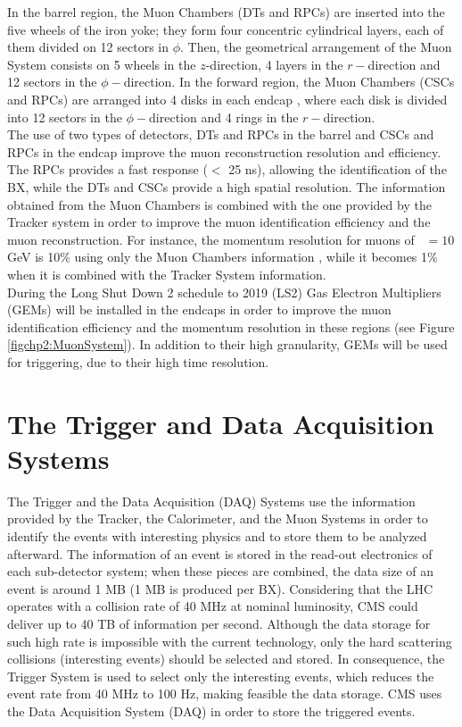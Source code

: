 \noindent In the barrel region, the Muon Chambers (DTs and RPCs) are inserted into the 
five wheels of the iron yoke; they form four concentric cylindrical 
layers, each of them divided on 12 sectors in $\phi$. Then, the geometrical 
arrangement of the Muon System consists on 5 wheels in the $z$-direction, 4 layers in 
the $r-$direction and 12 sectors in the $\phi-$direction. In the forward region, the Muon 
Chambers (CSCs and RPCs) are arranged into 4 disks in each endcap , where each disk is 
divided into 12 sectors in the $\phi-$direction and 4 rings in the $r-$direction. \\

\noindent The use of two types of detectors, DTs and RPCs in the barrel and CSCs and RPCs in the endcap
improve the muon reconstruction resolution and efficiency. The RPCs provides a fast 
response ($<$ 25 ns), allowing the identification of the BX, while the DTs and CSCs provide 
a high spatial resolution. The information obtained from the Muon Chambers
is combined with the one provided by the Tracker system in order to 
improve the muon identification efficiency and the muon reconstruction. For instance,
the momentum resolution for muons of \pt~$= 10$ GeV is 10$\%$ using only the Muon Chambers information
, while it becomes 1$\%$ when it is combined with the Tracker System information\cite{chp2:CMSTDR}.\\

\noindent During the Long Shut Down 2 schedule to 2019 (LS2) Gas Electron Multipliers (GEMs) will be installed in 
the endcaps in order to improve the muon identification efficiency and the momentum resolution in 
these regions (see Figure \ref{figchp2:MuonSystem}). In addition to their 
high granularity, GEMs will be used for triggering, due to their high time resolution.

\section{The Trigger and Data Acquisition Systems}
\label{sec:Trigger}

\noindent The Trigger and the Data Acquisition (DAQ) Systems use the information 
provided by the Tracker, the Calorimeter, and the Muon Systems in order 
to identify the events with interesting physics and to store them to be 
analyzed afterward. The information of an event is stored in 
the read-out electronics of each sub-detector system; when these 
pieces are combined, the data size of an event is around 
1 MB (1 MB is produced per BX). Considering that the LHC 
operates with a collision rate of 40 MHz at nominal luminosity, CMS could 
deliver up to 40 TB of information per second. Although the data storage 
for such high rate is impossible with the current technology, only the hard
scattering collisions (interesting events) should be selected and stored. In 
consequence, the Trigger System is used to select only the interesting events, which 
reduces the event rate from 40 MHz to 100 Hz, making feasible the data 
storage. CMS uses the Data Acquisition System (DAQ) in order to store
the triggered events. 


